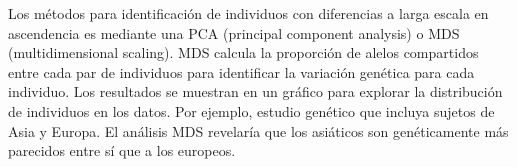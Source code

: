 Los métodos para identificación de individuos con diferencias a larga escala en ascendencia es mediante una PCA (principal component analysis) o MDS (multidimensional scaling). MDS calcula la proporción de alelos compartidos entre cada par de individuos para identificar la variación genética para cada individuo. Los resultados se muestran en un gráfico para explorar la distribución de individuos en los datos. Por ejemplo, estudio genético que incluya sujetos de Asia y Europa. El análisis MDS revelaría que los asiáticos son genéticamente más parecidos entre sí que a los europeos.